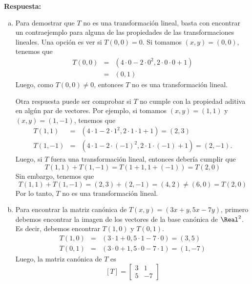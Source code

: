 \documentclass{article}
\begin{document}
\vspace{5mm}
\noindent\textbf{Respuesta:}
\begin{enumerate}[a)]
  \item Para demostrar que $T$ no es una transformación lineal, basta con encontrar un contraejemplo para alguna de las propiedades de las transformaciones lineales. Una opción es ver si $T(0,0)=0$. Si tomamos $(x,y)=(0,0)$, tenemos que 
  \begin{eqnarray*}
    T(0,0) &=& (4\cdot 0-2\cdot 0^2,2\cdot 0\cdot 0+1)\\
    &=& (0,1)
  \end{eqnarray*}
  Luego, como $T(0,0)\neq 0$, entonces $T$ no es una transformación lineal.

  \vspace{3mm}
  Otra respuesta puede ser comprobar si $T$ no cumple con la propiedad aditiva en algún par de vectores. Por ejemplo, si tomamos $(x,y)=(1,1)$ y $(x,y)=(1,-1)$, tenemos que
  \begin{eqnarray*}
    T(1,1) &=& (4\cdot 1-2\cdot 1^2,2\cdot 1\cdot 1+1) = (2,3)\\
    T(1,-1) &=& (4\cdot 1-2\cdot (-1)^2,2\cdot 1\cdot (-1)+1) = (2,-1).
  \end{eqnarray*}
  Luego, si $T$ fuera una transformación lineal, entonces debería cumplir que
  $$T(1,1)+T(1,-1) = T(1+1,1+(-1)) = T(2,0)$$
  Sin embargo, tenemos que
  $$T(1,1)+T(1,-1) = (2,3)+(2,-1) = (4,2)\neq (6,0) = T(2,0)$$
  Por lo tanto, $T$ no es una transformación lineal.

  \vspace{5mm}
  \item Para encontrar la matriz canónica de $T(x,y)=(3x+y,5x-7y)$, primero debemos encontrar la imagen de los vectores de la base canónica de $\Real^2$. Es decir, debemos encontrar $T(1,0)$ y $T(0,1)$.
  \begin{eqnarray*}
    T(1,0) &=& (3\cdot 1+0,5\cdot 1-7\cdot 0) = (3,5)\\
    T(0,1) &=& (3\cdot 0+1,5\cdot 0-7\cdot 1) = (1,-7)
  \end{eqnarray*}
  Luego, la matriz canónica de $T$ es
  $$[T] = \begin{bmatrix} 3 & 1\\ 5 & -7 \end{bmatrix}$$
\end{enumerate}
\end{document}
